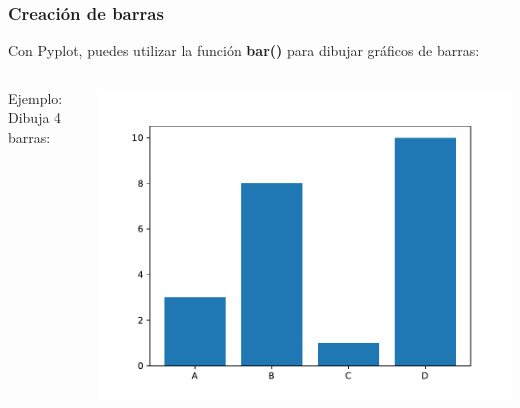 \begin{frame}[fragile]
  \frametitle{Creación de barras}
  Con Pyplot, puedes utilizar la función \textbf{bar()}
  para dibujar gráficos de barras:
  \begin{columns}
        \begin{exampleblock}{Ejemplo:}
          Dibuja 4 barras:
          
        \end{exampleblock}
      \pausa
      \begin{center}
          \includegraphics[scale=0.5]{ejemplos/e06.pdf}
      \end{center}
  \end{columns}
\end{frame}

